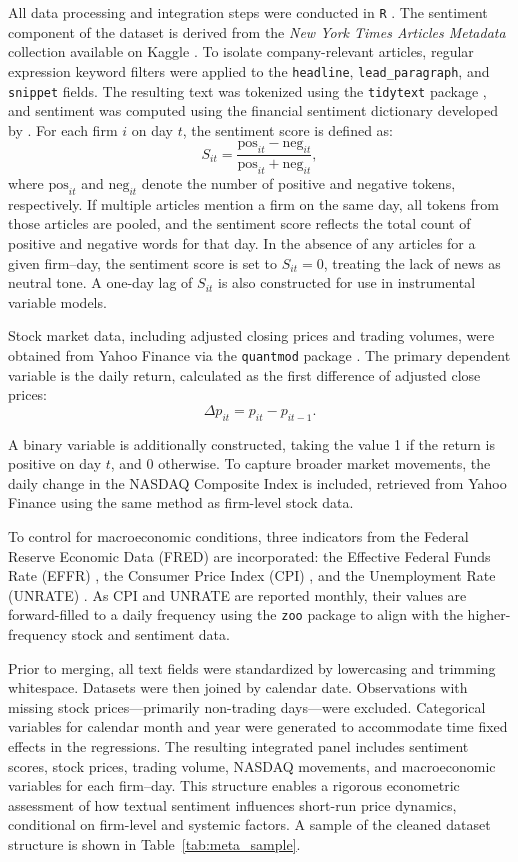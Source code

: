 \documentclass[12pt]{article}
\begin{document}
All data processing and integration steps were conducted in \texttt{R} \citep{R}. The sentiment component of the dataset is derived from the \textit{New York Times Articles Metadata} collection available on Kaggle \citep{kaggle2025}. To isolate company-relevant articles, regular expression keyword filters were applied to the \texttt{headline}, \texttt{lead\_paragraph}, and \texttt{snippet} fields. The resulting text was tokenized using the \texttt{tidytext} package \citep{silge2016}, and sentiment was computed using the financial sentiment dictionary developed by \citet{loughran2011}. For each firm \( i \) on day \( t \), the sentiment score is defined as:
\[
S_{it} = \frac{\text{pos}_{it} - \text{neg}_{it}}{\text{pos}_{it} + \text{neg}_{it}},
\]
where \( \text{pos}_{it} \) and \( \text{neg}_{it} \) denote the number of positive and negative tokens, respectively. If multiple articles mention a firm on the same day, all tokens from those articles are pooled, and the sentiment score reflects the total count of positive and negative words for that day. In the absence of any articles for a given firm--day, the sentiment score is set to \( S_{it} = 0 \), treating the lack of news as neutral tone. A one-day lag of \( S_{it} \) is also constructed for use in instrumental variable models.


Stock market data, including adjusted closing prices and trading volumes, were obtained from Yahoo Finance via the \texttt{quantmod} package \citep{quantmod2020}. The primary dependent variable is the daily return, calculated as the first difference of adjusted close prices:
\[
\Delta p_{it} = p_{it} - p_{it-1}.
\]

A binary variable is additionally constructed, taking the value 1 if the return is positive on day \( t \), and 0 otherwise. To capture broader market movements, the daily change in the NASDAQ Composite Index is included, retrieved from Yahoo Finance using the same method as firm-level stock data.

To control for macroeconomic conditions, three indicators from the Federal Reserve Economic Data (FRED) are incorporated: the Effective Federal Funds Rate (EFFR) \citep{fred_effr}, the Consumer Price Index (CPI) \citep{fred_cpi}, and the Unemployment Rate (UNRATE) \citep{fred_unrate}. As CPI and UNRATE are reported monthly, their values are forward-filled to a daily frequency using the \texttt{zoo} package \citep{zeileis2005} to align with the higher-frequency stock and sentiment data.

Prior to merging, all text fields were standardized by lowercasing and trimming whitespace. Datasets were then joined by calendar date. Observations with missing stock prices—primarily non-trading days—were excluded. Categorical variables for calendar month and year were generated to accommodate time fixed effects in the regressions. The resulting integrated panel includes sentiment scores, stock prices, trading volume, NASDAQ movements, and macroeconomic variables for each firm–day. This structure enables a rigorous econometric assessment of how textual sentiment influences short-run price dynamics, conditional on firm-level and systemic factors. A sample of the cleaned dataset structure is shown in Table~\ref{tab:meta_sample}.
\end{document}
